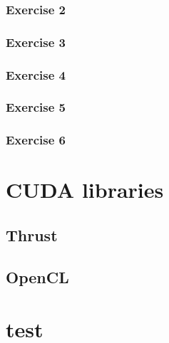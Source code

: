 \documentclass[12px,oz]{report}
\theoremstyle{indented}
\begin{document}
		\subsection{Exercise 2}
		
		\subsection{Exercise 3}
		
		
		\subsection{Exercise 4}
		
		
		\subsection{Exercise 5}
		
		\subsection{Exercise 6}
	
\chapter{CUDA libraries}
\label{ch-libraries}


	\section{Thrust}
	\label{sec-thrust}
	
	
	\section{OpenCL}
	\label{sec-opencl}
	

\cite{McCool2012}
\cite{udacity:parallel}




\appendix
\chapter{test}
\end{document}

